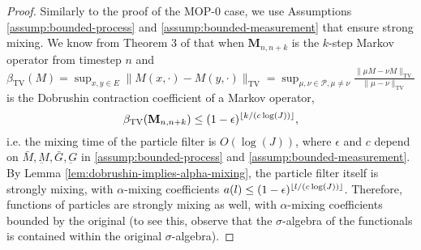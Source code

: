\begin{proof}
Similarly to the proof of the MOP-$0$ case, we use Assumptions \ref{assump:bounded-process} and \ref{assump:bounded-measurement} that ensure strong mixing. We know from Theorem 3 of \cite{karjalainen23} that when $\textbf{M}_{n,n+k}$ is the $k$-step Markov operator from timestep $n$ and $\beta_{\text{TV}}(M) = \sup _{x, y \in E}\|M(x, \cdot)-M(y, \cdot)\|_{\mathrm{TV}}=\sup _{\mu, \nu \in \mathcal{P}, \mu \neq \nu} \frac{\|\mu M-\nu M\|_{\mathrm{TV}}}{\|\mu-\nu\|_{\mathrm{TV}}}$ is the Dobrushin contraction coefficient of a Markov operator, 
\begin{equation}
\beta_{\text{TV}}(\textbf{M}_{n,n+k}) \leq (1-\epsilon)^{\lfloor k/(c\log(J)) \rfloor},
\end{equation}
i.e. the mixing time of the particle filter is $O(\log(J))$, where $\epsilon$ and $c$ depend on $\bar{M}, \underbar{M}, \bar{G}, \underbar{G}$ in \ref{assump:bounded-process} and \ref{assump:bounded-measurement}. By Lemma \ref{lem:dobrushin-implies-alpha-mixing}, the particle filter itself is strongly mixing, with $\alpha$-mixing coefficients $a(l) \leq (1-\epsilon)^{\lfloor l/(c\log(J)) \rfloor}$. Therefore, functions of particles are strongly mixing as well, with $\alpha$-mixing coefficients bounded by the original (to see this, observe that the $\sigma$-algebra of the functionals is contained within the original $\sigma$-algebra).


\end{proof}
